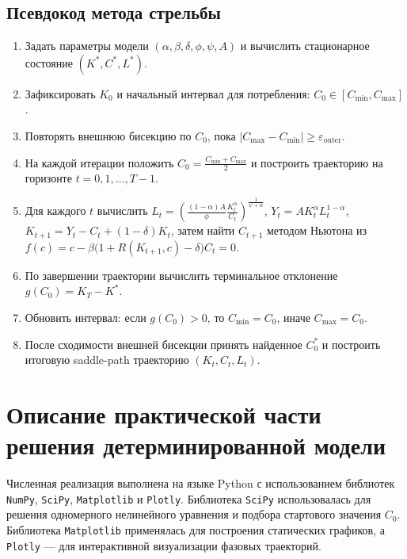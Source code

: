 \documentclass[12pt,a4paper]{report}   %
\begin{document}
        \section{Псевдокод метода стрельбы}
            \begin{enumerate}[label=\arabic*)]
                \item Задать параметры модели $(\alpha,\beta,\delta,\phi,\psi,A)$ и вычислить стационарное состояние $(K^*,C^*,L^*)$.
                \item Зафиксировать $K_0$ и начальный интервал для потребления: $C_0\in[C_{\min},C_{\max}]$.
                \item Повторять внешнюю бисекцию по $C_0$, пока $|C_{\max}-C_{\min}|\ge\varepsilon_{\text{outer}}$.
                \item На каждой итерации положить $C_0=\frac{C_{\min}+C_{\max}}{2}$ и построить траекторию на горизонте $t=0,1,\dots,T-1$.
                \item Для каждого $t$ вычислить
                \(L_t=\left(\frac{(1-\alpha)A}{\phi}\frac{K_t^\alpha}{C_t}\right)^{\frac{1}{\psi+\alpha}}\),
                \(Y_t=A K_t^\alpha L_t^{1-\alpha}\),
                \(K_{t+1}=Y_t-C_t+(1-\delta)K_t\),
                затем найти $C_{t+1}$ методом Ньютона из
                \(f(c)=c-\beta\bigl(1+R(K_{t+1},c)-\delta\bigr)C_t=0\).
                \item По завершении траектории вычислить терминальное отклонение $g(C_0)=K_T-K^*$.
                \item Обновить интервал: если $g(C_0)>0$, то $C_{\min}=C_0$, иначе $C_{\max}=C_0$.
                \item После сходимости внешней бисекции принять найденное $C_0^*$ и построить итоговую saddle-path траекторию $(K_t,C_t,L_t)$.
            \end{enumerate}




    \chapter{Описание практической части решения детерминированной модели}
        Численная реализация выполнена на языке Python с использованием библиотек \texttt{NumPy}, \texttt{SciPy}, \texttt{Matplotlib} и \texttt{Plotly}. Библиотека \texttt{SciPy} использовалась для решения одномерного нелинейного уравнения и подбора стартового значения $C_0$. Библиотека \texttt{Matplotlib} применялась для построения статических графиков, а \texttt{Plotly} --- для интерактивной визуализации фазовых траекторий.
\end{document}
